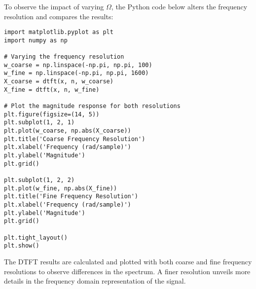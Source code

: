 
\item[(c)]
To observe the impact of varying $\Omega$, the Python code below alters the frequency resolution and compares the results:

\begin{verbatim}
import matplotlib.pyplot as plt
import numpy as np

# Varying the frequency resolution
w_coarse = np.linspace(-np.pi, np.pi, 100)
w_fine = np.linspace(-np.pi, np.pi, 1600)
X_coarse = dtft(x, n, w_coarse)
X_fine = dtft(x, n, w_fine)

# Plot the magnitude response for both resolutions
plt.figure(figsize=(14, 5))
plt.subplot(1, 2, 1)
plt.plot(w_coarse, np.abs(X_coarse))
plt.title('Coarse Frequency Resolution')
plt.xlabel('Frequency (rad/sample)')
plt.ylabel('Magnitude')
plt.grid()

plt.subplot(1, 2, 2)
plt.plot(w_fine, np.abs(X_fine))
plt.title('Fine Frequency Resolution')
plt.xlabel('Frequency (rad/sample)')
plt.ylabel('Magnitude')
plt.grid()

plt.tight_layout()
plt.show()
\end{verbatim}

The DTFT results are calculated and plotted with both coarse and fine frequency resolutions to observe differences in the spectrum.
A finer resolution unveils more details in the frequency domain representation of the signal.
